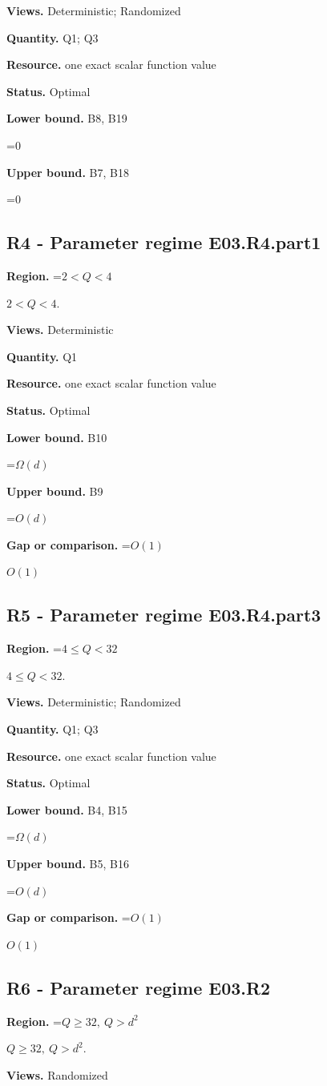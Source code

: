 \documentclass[10pt,a4paper]{article}
\newcommand{\AtlasMath}[1]{\par\begingroup\centering\setbox0=\hbox{$\displaystyle #1$}\ifdim\wd0>1.4\linewidth\typeout{ATLAS WIDE FORMULA: \the\wd0}\fi\ifdim\wd0>\linewidth\resizebox{\linewidth}{!}{\box0}\else\box0\fi\par\endgroup}
\newcommand{\AtlasInlineMath}[1]{\begingroup\setbox0=\hbox{$#1$}\ifdim\wd0>.4\linewidth\endgroup\AtlasMath{#1}\else\endgroup$#1$\fi}
\begin{document}
\textbf{Views.} Deterministic; Randomized

\textbf{Quantity.} Q1; Q3

\textbf{Resource.} one exact scalar function value

\textbf{Status.} Optimal

\textbf{Lower bound.} B8, B19

\AtlasMath{0}
\textbf{Upper bound.} B7, B18

\AtlasMath{0}
\subsection{R4 - Parameter regime E03.R4.part1}
\textbf{Region.} \AtlasInlineMath{2<Q<4}.

\textbf{Views.} Deterministic

\textbf{Quantity.} Q1

\textbf{Resource.} one exact scalar function value

\textbf{Status.} Optimal

\textbf{Lower bound.} B10

\AtlasMath{\Omega(d)}
\textbf{Upper bound.} B9

\AtlasMath{O(d)}
\textbf{Gap or comparison.} \AtlasInlineMath{O(1)}

\subsection{R5 - Parameter regime E03.R4.part3}
\textbf{Region.} \AtlasInlineMath{4\le Q<32}.

\textbf{Views.} Deterministic; Randomized

\textbf{Quantity.} Q1; Q3

\textbf{Resource.} one exact scalar function value

\textbf{Status.} Optimal

\textbf{Lower bound.} B4, B15

\AtlasMath{\Omega(d)}
\textbf{Upper bound.} B5, B16

\AtlasMath{O(d)}
\textbf{Gap or comparison.} \AtlasInlineMath{O(1)}

\subsection{R6 - Parameter regime E03.R2}
\textbf{Region.} \AtlasInlineMath{Q\ge32,\ Q>d^2}.

\textbf{Views.} Randomized
\end{document}

